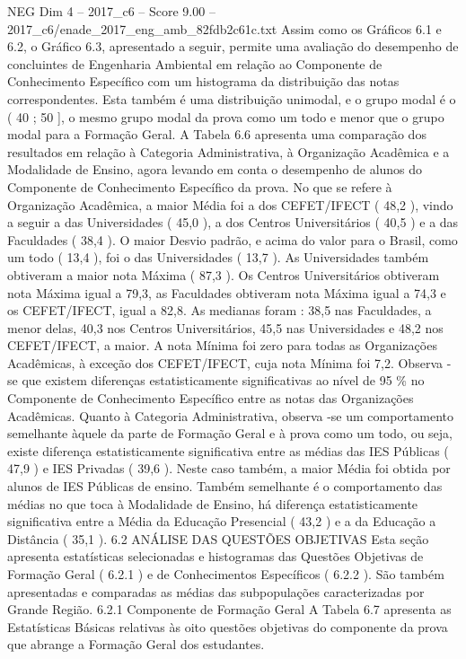 \begin{textsample}{NEG Dim 4 – 2017\_c6 – Score 9.00 – 2017\_c6/enade\_2017\_eng\_amb\_82fdb2c61c.txt}
Assim como os Gráficos 6.1 e 6.2, o Gráfico 6.3, apresentado a seguir, permite uma avaliação do desempenho de concluintes de Engenharia Ambiental em relação ao Componente de Conhecimento Específico com um histograma da distribuição das notas correspondentes.
Esta também é uma distribuição unimodal, e o grupo modal é o ( 40 ; 50 ], o mesmo grupo modal da prova como um todo e menor que o grupo modal para a Formação Geral.
A Tabela 6.6 apresenta uma comparação dos resultados em relação à Categoria Administrativa, à Organização Acadêmica e a Modalidade de Ensino, agora levando em conta o desempenho de alunos do Componente de Conhecimento Específico da prova.
No que se refere à Organização Acadêmica, a maior Média foi a dos CEFET/IFECT ( 48,2 ), vindo a seguir a das Universidades ( 45,0 ), a dos Centros Universitários ( 40,5 ) e a das Faculdades ( 38,4 ).
O maior Desvio padrão, e acima do valor para o Brasil, como um todo ( 13,4 ), foi o das Universidades ( 13,7 ).
As Universidades também obtiveram a maior nota Máxima ( 87,3 ).
Os Centros Universitários obtiveram nota Máxima igual a 79,3, as Faculdades obtiveram nota Máxima igual a 74,3 e os CEFET/IFECT, igual a 82,8.
As medianas foram : 38,5 nas Faculdades, a menor delas, 40,3 nos Centros Universitários, 45,5 nas Universidades e 48,2 nos CEFET/IFECT, a maior.
A nota Mínima foi zero para todas as Organizações Acadêmicas, à exceção dos CEFET/IFECT, cuja nota Mínima foi 7,2.
Observa -se que existem diferenças estatisticamente significativas ao nível de 95 \% no Componente de Conhecimento Específico entre as notas das Organizações Acadêmicas.
Quanto à Categoria Administrativa, observa -se um comportamento semelhante àquele da parte de Formação Geral e à prova como um todo, ou seja, existe diferença estatisticamente significativa entre as médias das IES Públicas ( 47,9 ) e IES Privadas ( 39,6 ).
Neste caso também, a maior Média foi obtida por alunos de IES Públicas de ensino.
Também semelhante é o comportamento das médias no que toca à Modalidade de Ensino, há diferença estatisticamente significativa entre a Média da Educação Presencial ( 43,2 ) e a da Educação a Distância ( 35,1 ). 6.2 ANÁLISE DAS QUESTÕES OBJETIVAS Esta seção apresenta estatísticas selecionadas e histogramas das Questões Objetivas de Formação Geral ( 6.2.1 ) e de Conhecimentos Específicos ( 6.2.2 ).
São também apresentadas e comparadas as médias das subpopulações caracterizadas por Grande Região. 6.2.1 Componente de Formação Geral A Tabela 6.7 apresenta as Estatísticas Básicas relativas às oito questões objetivas do componente da prova que abrange a Formação Geral dos estudantes.

\end{textsample}

